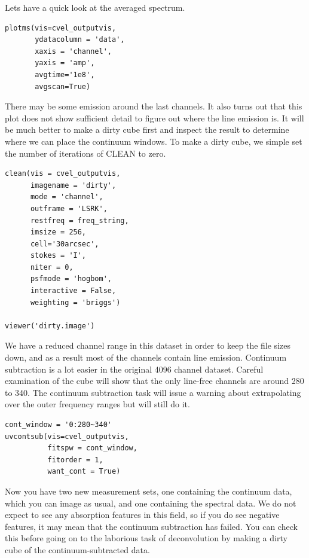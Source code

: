 \documentclass[force,almostfull,justified]{tufte-book}
\begin{document}
Lets have a quick look at the averaged spectrum.

\begin{casacmd}
\begin{verbatim}
plotms(vis=cvel_outputvis, 
       ydatacolumn = 'data',
       xaxis = 'channel',
       yaxis = 'amp',
       avgtime='1e8',
       avgscan=True)
\end{verbatim}
\end{casacmd}

There may be some emission around the last channels. It also turns out
that this plot does not show sufficient detail to figure out where the
line emission is.  It will be much better to make a dirty cube first and
inspect the result to determine where we can place the continuum
windows. To make a dirty cube, we simple set the number of iterations of
CLEAN to zero.

\begin{casacmd}
\begin{verbatim}
clean(vis = cvel_outputvis,
      imagename = 'dirty',
      mode = 'channel',
      outframe = 'LSRK',
      restfreq = freq_string,
      imsize = 256,
      cell='30arcsec',
      stokes = 'I',
      niter = 0,
      psfmode = 'hogbom',
      interactive = False,
      weighting = 'briggs')

viewer('dirty.image')
\end{verbatim}
\end{casacmd}

We have a reduced channel range in this dataset in order to keep the
file sizes down, and as a result most of the channels contain line
emission.  Continuum subtraction is a lot easier in the original 4096
channel dataset.  Careful examination of the cube will show that the
only line-free channels are around 280 to 340. The continuum subtraction
task will issue a warning about extrapolating over the outer frequency
ranges but will still do it.

\begin{casacmd}
\begin{verbatim}
cont_window = '0:280~340'
uvcontsub(vis=cvel_outputvis,
          fitspw = cont_window,
          fitorder = 1,
          want_cont = True)
\end{verbatim}
\end{casacmd}

Now you have two new measurement sets, one containing the continuum
data, which you can image as usual, and one containing the spectral
data.  We do not expect to see any absorption features in this field, so
if you do see negative features, it may mean that the continuum
subtraction has failed. You can check this before going on to the
laborious task of deconvolution by making a dirty cube of the
continuum-subtracted data.
\end{document}
